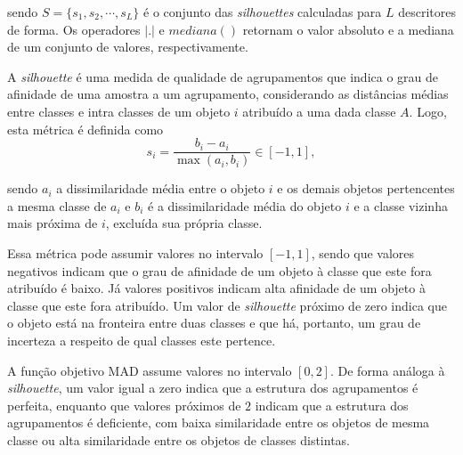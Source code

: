 \noindent sendo $S = \{s_1,s_2,\cdots,s_L\}$ é o conjunto das \emph{silhouettes} calculadas para $L$ descritores de forma. Os operadores $|.|$  e {$mediana ( )$} retornam o valor absoluto e a mediana de um conjunto de valores, respectivamente.

A \textit{silhouette }\cite{Rousseeuw:1987} é uma medida de qualidade de agrupamentos que indica o grau de afinidade de uma amostra  a um agrupamento, considerando as distâncias médias entre classes e intra classes de um objeto $i$ atribuído a uma dada classe $A$. Logo, esta métrica é definida como 
\begin{equation}
s_i = \frac{b_i - a_i}{\max{(a_i,b_i)}} \in [-1,1],
\end{equation}

\noindent sendo $a_i$ a dissimilaridade média entre o objeto $i$ e os demais objetos pertencentes a mesma classe de $a_i$ e $b_i$ é a dissimilaridade média do objeto $i$ e a classe vizinha mais próxima de $i$, excluída sua própria classe. 

Essa métrica pode assumir valores no intervalo $[-1,1]$, sendo que valores negativos indicam que o grau de afinidade de um objeto à classe que este fora atribuído é baixo. Já valores positivos indicam alta afinidade de um objeto à classe que este fora atribuído. Um valor de \textit{silhouette} próximo de zero indica que o objeto está na fronteira entre duas classes e que há, portanto, um grau de incerteza a respeito de qual classes este pertence.

A função objetivo \ac{MAD} assume valores no intervalo $[0,2]$. De forma análoga à \textit{silhouette}, um valor igual a zero indica que a estrutura dos agrupamentos é perfeita, enquanto que valores próximos de $2$ indicam que a estrutura dos agrupamentos é deficiente, com baixa similaridade entre os objetos de mesma classe ou alta similaridade entre os objetos de classes distintas.


